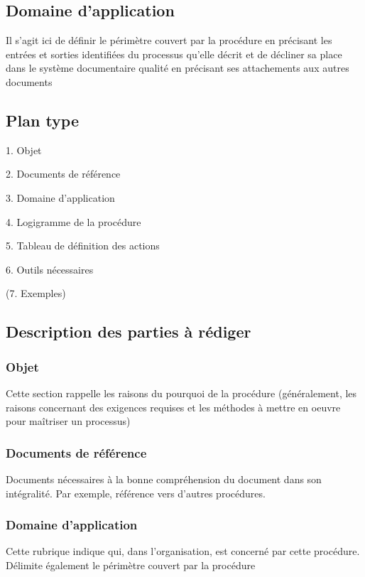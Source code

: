 \documentclass{mise_en_page}
\begin{document}
\subsection[Domaine d’application]{Domaine d’application}

Il s’agit ici de définir le périmètre couvert par la procédure en
précisant les entrées et sorties identifiées du processus qu’elle
décrit et de décliner sa place dans le système documentaire qualité en
précisant ses attachements aux autres documents

\subsection[Plan type]{Plan type}

1. Objet

2. Documents de référence

3. Domaine d’application

4. Logigramme de la procédure

5. Tableau de définition des actions

6. Outils nécessaires

(7. Exemples)

\subsection[Description des parties à rédiger]{Description des
parties à rédiger}
\subsubsection[Objet]{Objet}
Cette section rappelle les raisons du pourquoi de la procédure
(généralement, les raisons concernant des exigences requises et les
méthodes à mettre en oeuvre pour maîtriser un processus)

\subsubsection[Documents de référence]{Documents de
référence}
Documents nécessaires à la bonne compréhension du document dans son
intégralité. Par exemple, référence vers d’autres procédures.

\subsubsection[Domaine d’application]{Domaine
d’application}
Cette rubrique indique qui, dans l’organisation, est concerné par cette
procédure. Délimite également le périmètre couvert par la procédure
\end{document}
